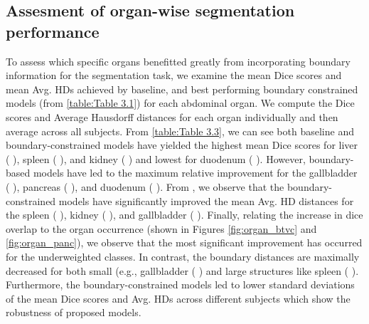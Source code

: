 \documentclass[final,5p,times,twocolumn]{elsarticle}
\begin{document}
\subsection{Assesment of organ-wise segmentation performance}
To assess which specific organs benefitted greatly from incorporating boundary information for the segmentation task, we examine the mean Dice scores and mean Avg. HDs achieved by baseline, and best performing boundary constrained models (from \autoref{table:Table 3.1}) for each abdominal organ. We compute the Dice scores and Average Hausdorff distances for each organ individually and then average across all subjects. From \autoref{table:Table 3.3}, we can see both baseline and boundary-constrained models have yielded the highest mean Dice scores for liver (  ), spleen (  ), and kidney (  ) and lowest for duodenum (  ). However, boundary-based models have led to the maximum relative improvement for the gallbladder (  ), pancreas (  ), and duodenum (  ). From , we observe that the boundary-constrained models have significantly improved the mean Avg. HD distances for the spleen (  ), kidney (  ), and gallbladder (  ). Finally, relating the increase in dice overlap to the organ occurrence (shown in Figures \ref{fig:organ_btvc} and \ref{fig:organ_panc}), we observe that the most significant improvement has occurred for the underweighted classes. In contrast, the boundary distances are maximally decreased for both small (e.g., gallbladder (  ) and large structures like spleen (  ). Furthermore, the boundary-constrained models led to lower standard deviations of the mean Dice scores and Avg. HDs across different subjects which show the robustness of proposed models.
\end{document}

